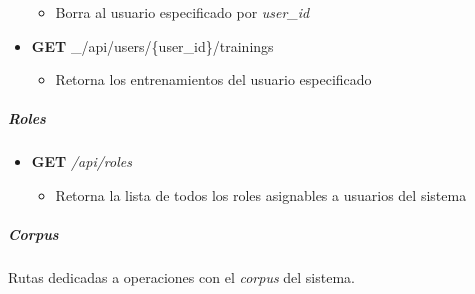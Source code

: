 \documentclass[12pt,a4paper,]{scrartcl}
\providecommand{\tightlist}{%
  \setlength{\itemsep}{0pt}\setlength{\parskip}{0pt}}
\let\oldsubparagraph\subparagraph
\renewcommand{\subparagraph}[1]{\oldsubparagraph{#1}\mbox{}}
\begin{document}
\begin{itemize}
  \begin{itemize}
  \tightlist
  \item
    Borra al usuario especificado por \emph{user\_id}
  \end{itemize}
\item
  \textbf{GET} \_/api/users/\{user\_id\}/trainings

  \begin{itemize}
  \tightlist
  \item
    Retorna los entrenamientos del usuario especificado
  \end{itemize}
\end{itemize}

\hypertarget{roles}{%
\subparagraph{Roles}\label{roles}}

\begin{itemize}
\tightlist
\item
  \textbf{GET} \emph{/api/roles}

  \begin{itemize}
  \tightlist
  \item
    Retorna la lista de todos los roles asignables a usuarios del sistema
  \end{itemize}
\end{itemize}

\hypertarget{corpus-2}{%
\subparagraph{Corpus}\label{corpus-2}}

Rutas dedicadas a operaciones con el \emph{corpus} del sistema.
\end{document}

